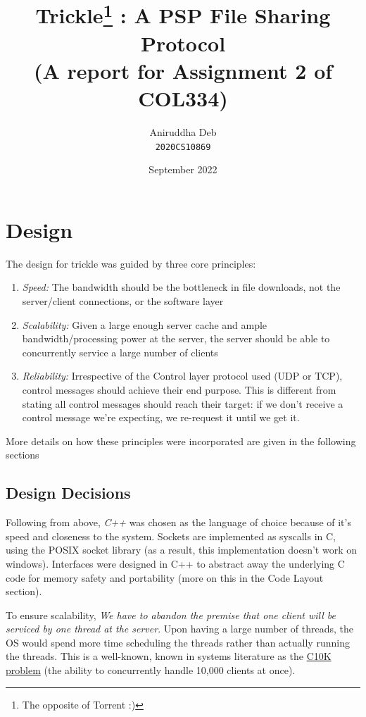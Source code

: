 \documentclass[12pt]{article}
\title{%
  \textbf{Trickle\footnote{The opposite of Torrent :)} : A PSP File Sharing Protocol} \\
  {\large (A report for Assignment 2 of COL334)}
}
\author{Aniruddha Deb \\ \texttt{2020CS10869}}
\date{September 2022}
\begin{document}
\maketitle

\tableofcontents

\clearpage

\section{Design}

The design for trickle was guided by three core principles:
\begin{enumerate}
\item \emph{Speed:} The bandwidth should be the bottleneck in file downloads, not the server/client connections, or the software layer
\item \emph{Scalability:} Given a large enough server cache and ample bandwidth/processing power at the server, the server should be able to concurrently service a large number of clients
\item \emph{Reliability:} Irrespective of the Control layer protocol used (UDP or TCP), control messages should achieve their end purpose. This is different from stating all control messages should reach their target: if we don't receive a control message we're expecting, we re-request it until we get it.
\end{enumerate}

More details on how these principles were incorporated are given in the following sections

\subsection{Design Decisions}

Following from above, \emph{C++} was chosen as the language of choice because of it's speed and closeness to the system. Sockets are implemented as syscalls in C, using the POSIX socket library (as a result, this implementation doesn't work on windows). Interfaces were designed in C++ to abstract away the underlying C code for memory safety and portability (more on this in the Code Layout section).

To ensure scalability, \emph{We have to abandon the premise that one client will be serviced by one thread at the server}. Upon having a large number of threads, the OS would spend more time scheduling the threads rather than actually running the threads. This is a well-known, known in systems literature as the \href{https://en.wikipedia.org/wiki/C10k_problem#}{C10K problem} (the ability to concurrently handle 10,000 clients at once).
\end{document}
